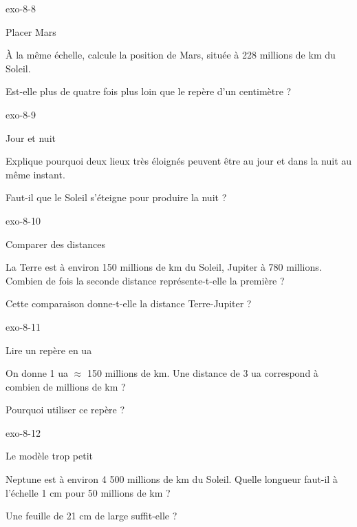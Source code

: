 \documentclass[12pt,twoside,openany]{book}
\begin{document}
\begin{blocLivre}{exo-8-8}
\begin{exercice}[2]{Placer Mars}
\begin{questions}
\item À la même échelle, calcule la position de Mars, située à 228 millions de km du Soleil.
\item Est-elle plus de quatre fois plus loin que le repère d’un centimètre ?
\end{questions}
\end{exercice}\end{blocLivre}
\begin{blocLivre}{exo-8-9}
\begin{exercice}[2]{Jour et nuit}
\begin{questions}
\item Explique pourquoi deux lieux très éloignés peuvent être au jour et dans la nuit au même instant.
\item Faut-il que le Soleil s’éteigne pour produire la nuit ?
\end{questions}
\end{exercice}\end{blocLivre}
\begin{blocLivre}{exo-8-10}
\begin{exercice}[2]{Comparer des distances}
\begin{questions}
\item La Terre est à environ 150 millions de km du Soleil, Jupiter à 780 millions. Combien de fois la seconde distance représente-t-elle la première ?
\item Cette comparaison donne-t-elle la distance Terre-Jupiter ?
\end{questions}
\end{exercice}\end{blocLivre}
\begin{blocLivre}{exo-8-11}
\begin{exercice}[2]{Lire un repère en ua}
\begin{questions}
\item On donne 1 ua \(\approx\) 150 millions de km. Une distance de 3 ua correspond à combien de millions de km ?
\item Pourquoi utiliser ce repère ?
\end{questions}
\end{exercice}\end{blocLivre}
\begin{blocLivre}{exo-8-12}
\begin{exercice}[3]{Le modèle trop petit}
\begin{questions}
\item Neptune est à environ 4 500 millions de km du Soleil. Quelle longueur faut-il à l’échelle 1 cm pour 50 millions de km ?
\item Une feuille de 21 cm de large suffit-elle ?
\end{questions}
\end{exercice}\end{blocLivre}
\end{document}
